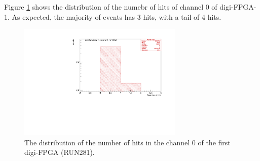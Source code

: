 Figure \ref{fig:66} shows the distribution of the numebr of 
hits of channel 0 of digi-FPGA-1. As expected, the majority of events 
has 3 hits, with a tail of 4 hits.
\begin{figure}[!h]
\centering
\includegraphics[width =0.7\textwidth]{figures/pdf/figure_00066_nhits_ch00_run281.pdf}
\caption{
  The distribution of the number of hits in the channel 0 of the first digi-FPGA (RUN281).
}
\label{fig:66}
\end{figure}

